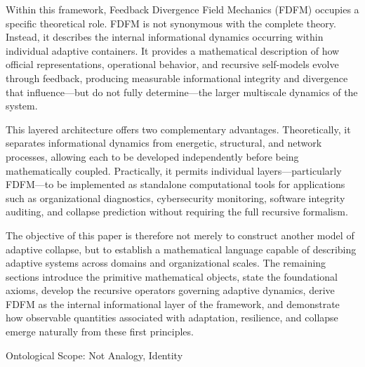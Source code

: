 \documentclass[
]{article}
\begin{document}
Within this framework, Feedback Divergence Field Mechanics (FDFM)
occupies a specific theoretical role. FDFM is not synonymous with the
complete theory. Instead, it describes the internal informational
dynamics occurring within individual adaptive containers. It provides a
mathematical description of how official representations, operational
behavior, and recursive self-models evolve through feedback, producing
measurable informational integrity and divergence that influence---but
do not fully determine---the larger multiscale dynamics of the system.

This layered architecture offers two complementary advantages.
Theoretically, it separates informational dynamics from energetic,
structural, and network processes, allowing each to be developed
independently before being mathematically coupled. Practically, it
permits individual layers---particularly FDFM---to be implemented as
standalone computational tools for applications such as organizational
diagnostics, cybersecurity monitoring, software integrity auditing, and
collapse prediction without requiring the full recursive formalism.

The objective of this paper is therefore not merely to construct another
model of adaptive collapse, but to establish a mathematical language
capable of describing adaptive systems across domains and organizational
scales. The remaining sections introduce the primitive mathematical
objects, state the foundational axioms, develop the recursive operators
governing adaptive dynamics, derive FDFM as the internal informational
layer of the framework, and demonstrate how observable quantities
associated with adaptation, resilience, and collapse emerge naturally
from these first principles.

Ontological Scope: Not Analogy, Identity
\end{document}
